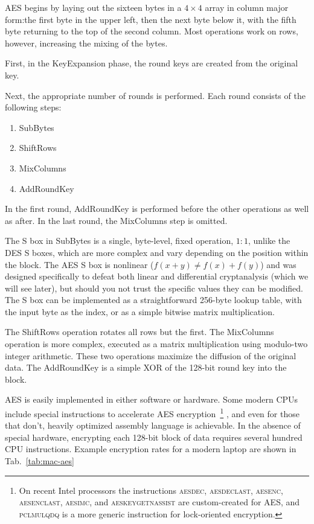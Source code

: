 \documentclass[%
 aip,
 jmp,%
 amsmath,amssymb,
 reprint,%
]{revtex4-1}
\begin{document}
AES begins by laying out the sixteen bytes in a $4\times 4$ array in column major form:the first byte in the upper left, then the next byte below it, with the fifth byte returning to the top of the second column. Most operations work on rows, however, increasing the mixing of the bytes.

First, in the KeyExpansion phase, the round keys are created from the original key.

Next, the appropriate number of rounds is performed. Each round consists of the following steps:

\begin{enumerate}
\item SubBytes
\item ShiftRows
\item MixColumns
\item AddRoundKey
\end{enumerate}

In the first round, AddRoundKey is performed before the other operations as well as after. In the last round, the MixColumns step is omitted.

The S box in SubBytes is a single, byte-level, fixed operation, $1:1$, unlike the DES S boxes, which are more complex and vary depending on the position within the block. The AES S box is nonlinear ($f(x+y) \ne f(x)+f(y)$) and was designed specifically to defeat both linear and differential cryptanalysis (which we will see later), but should you not trust the specific values they can be modified. The S box can be implemented as a straightforward 256-byte lookup table, with the input byte as the index, or as a simple bitwise matrix multiplication.

The ShiftRows operation rotates all rows but the first. The MixColumns operation is more complex, executed as a matrix multiplication using modulo-two integer arithmetic. These two operations maximize the diffusion of the original data. The AddRoundKey is a simple XOR of the 128-bit round key into the block.

AES is easily implemented in either software or hardware. Some modern
CPUs include special instructions to accelerate AES
encryption~\footnote{On recent Intel processors the instructions
  \textsc{aesdec}, \textsc{aesdeclast}, \textsc{aesenc},
  \textsc{aesenclast}, \textsc{aesimc}, and \textsc{aeskeygetnassist}
  are custom-created for AES, and \textsc{pclmulqdq} is a more generic
  instruction for lock-oriented encryption.} , and even for those that
don't, heavily optimized assembly language is achievable.  In the
absence of special hardware, encrypting each 128-bit block of data
requires several hundred CPU instructions. Example encryption rates
for a modern laptop are shown in Tab.~\ref{tab:mac-aes}
\end{document}
